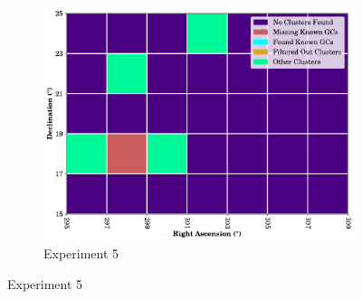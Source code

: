 \begin{figure}[H]
    \begin{subfigure}[b]{0.5\textwidth}
        \includegraphics[width=\textwidth]{./figures/rasters/grids/grid-run-05-a2.pdf}
        \caption{Experiment 5}
    \end{subfigure}
\end{figure}

